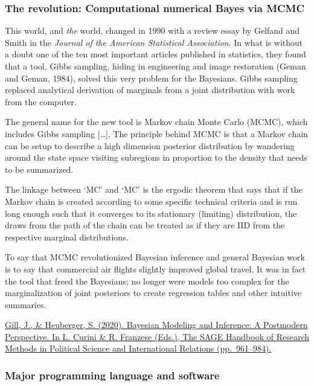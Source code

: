 \documentclass[
  11pt,
]{article}
\begin{document}
\hypertarget{the-revolution-computational-numerical-bayes-via-mcmc}{%
\subsubsection{The revolution: Computational numerical Bayes via MCMC}\label{the-revolution-computational-numerical-bayes-via-mcmc}}

This world, and \emph{the} world, changed in 1990 with a review essay by Gelfand and Smith in the \emph{Journal of the American Statistical Association}. In what is without a doubt one of the ten most important articles published in statistics, they found that a tool, Gibbs sampling, hiding in engineering and image restoration (Geman and Geman, 1984), solved this very problem for the Bayesians. Gibbs sampling replaced analytical derivation of marginals from a joint distribution with work from the computer.

The general name for the new tool is Markov chain Monte Carlo (MCMC), which includes Gibbs sampling {[}\ldots{]}. The principle behind MCMC is that a Markov chain can be setup to describe a high dimension posterior distribution by wandering around the state space visiting subregions in proportion to the density that needs to be summarized.

The linkage between `MC' and `MC' is the ergodic theorem that says that if the Markov chain is created according to some specific technical criteria and is run long enough such that it converges to its stationary (limiting) distribution, the draws from the path of the chain can be treated as if they are IID from the respective marginal distributions.

To say that MCMC revolutionized Bayesian inference and general Bayesian work is to say that commercial air flights slightly improved global travel. It was in fact the tool that freed the Bayesians; no longer were models too complex for the marginalization of joint posteriors to create regression tables and other intuitive summaries.

\href{https://jeffgill.org/wp-content/uploads/2021/04/curini_franzese_v2_chp50_1pp_01.pdf}{Gill, J., \& Heuberger, S. (2020). Bayesian Modeling and Inference: A Postmodern Perspective. In L. Curini \& R. Franzese (Eds.), The SAGE Handbook of Research Methods in Political Science and International Relations (pp.~961--984).}

\hypertarget{major-programming-language-and-software}{%
\subsubsection{Major programming language and software}\label{major-programming-language-and-software}}
\end{document}
